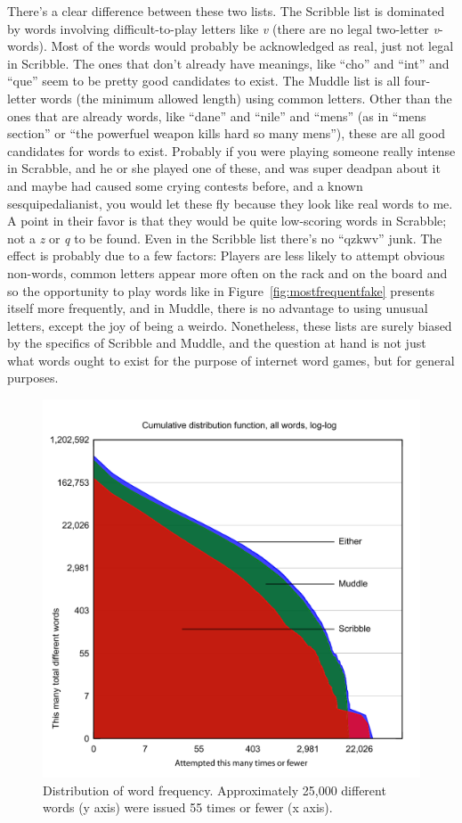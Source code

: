 \documentclass[twocolumn]{article}
\begin{document}
There's a clear difference between these two lists. The Scribble list
is dominated by words involving difficult-to-play letters like {\it v}
(there are no legal two-letter {\it v}-words). Most of the words would
probably be acknowledged as real, just not legal in Scribble. The ones
that don't already have meanings, like ``cho'' and ``int'' and ``que''
seem to be pretty good candidates to exist. The Muddle list is all
four-letter words (the minimum allowed length) using common letters.
Other than the ones that are already words, like ``dane'' and ``nile''
and ``mens'' (as in ``mens section'' or ``the powerfuel weapon kills
hard so many mens''), these are all good candidates for words to
exist. Probably if you were playing someone really intense in
Scrabble, and he or she played one of these, and was super deadpan
about it and maybe had caused some crying contests before, and a known
sesquipedalianist, you would let these fly because they look like real
words to me. A point in their favor is that they would be quite
low-scoring words in Scrabble; not a {\it z} or {\it q} to be found.
Even in the Scribble list there's no ``qzkwv'' junk. The effect is
probably due to a few factors: Players are less likely to attempt
obvious non-words, common letters appear more often on the rack and on
the board and so the opportunity to play words like in
Figure~\ref{fig:mostfrequentfake} presents itself more frequently, and
in Muddle, there is no advantage to using unusual letters, except the
joy of being a weirdo. Nonetheless, these lists are surely biased by
the specifics of Scribble and Muddle, and the question at hand is not
just what words ought to exist for the purpose of internet word games,
but for general purposes.

\begin{figure}
\includegraphics[width=\linewidth]{wishlist-cdf}
\caption{Distribution of word frequency. Approximately 25,000
  different words (y axis) were issued 55 times or fewer (x axis).}
\label{fig:gamedistribution}
\end{figure}
\end{document}
